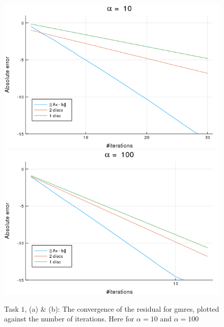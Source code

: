 \begin{figure}[h!]
\centering
\includegraphics[scale=0.4]{../task2/images/Task2_ab_a10_conv.png}
\includegraphics[scale=0.4]{../task2/images/Task2_ab_a100_conv.png}
\caption{Task $1$, (a) \& (b): The convergence of the residual for gmres, plotted against the number of iterations. Here for $\alpha=10$ and $\alpha=100$}
\label{fig:task2a_10_100}
\end{figure}


